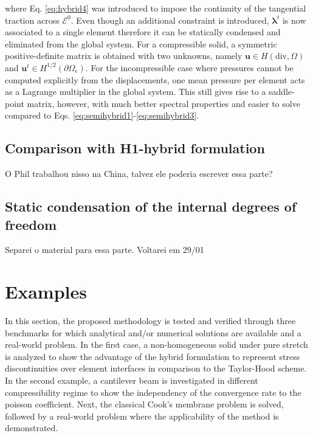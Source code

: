 \documentclass[english,11pt,3p,number,sort&compress]{elsarticle}
\newcommand{\giovane}{\color{red}{\bf\Large GA} \color{cyan} }
\begin{document}
\noindent where Eq. \eqref{eq:hybrid4} was introduced to impose the continuity of the tangential traction across $\mathcal{E}^0$. Even though an additional constraint is introduced, $\boldsymbol{\lambda}^t$ is now associated to a single element therefore it can be statically condensed and eliminated from the global system. For a compressible solid, a symmetric positive-definite matrix is obtained with two unknowns, namely $\mathbf{u} \in H(\text{div},\Omega)$ and $\mathbf{u}^t \in H^{1/2}(\partial\Omega_e)$. For the incompressible case where pressures cannot be computed explicitly from the displacements, one mean pressure per element acts as a Lagrange multiplier in the global system. This still gives rise to a saddle-point matrix, however, with much better spectral properties and easier to solve compared to Eqs. \eqref{eq:semihybrid1}-\eqref{eq:semihybrid3}.

\subsection{Comparison with H1-hybrid formulation}

{\giovane O Phil trabalhou nisso na China, talvez ele poderia escrever essa parte?}
\lipsum[1-1]

\subsection{Static condensation of the internal degrees of freedom}

{\giovane Separei o material para essa parte. Voltarei em 29/01}

\section{Examples \label{sec:Examples}}

In this section, the proposed methodology is tested and verified through three benchmarks for which analytical and/or numerical solutions are available and a real-world problem. In the first case, a non-homogeneous solid under pure stretch is analyzed to show the advantage of the hybrid formulation to represent stress discontinuities over element interfaces in comparison to the Taylor-Hood scheme. In the second example, a cantilever beam is investigated in different compressibility regime to show the independency of the convergence rate to the poisson coefficient. Next, the classical Cook's membrane problem is solved, followed by a real-world problem where the applicability of the method is demonstrated.
\end{document}
